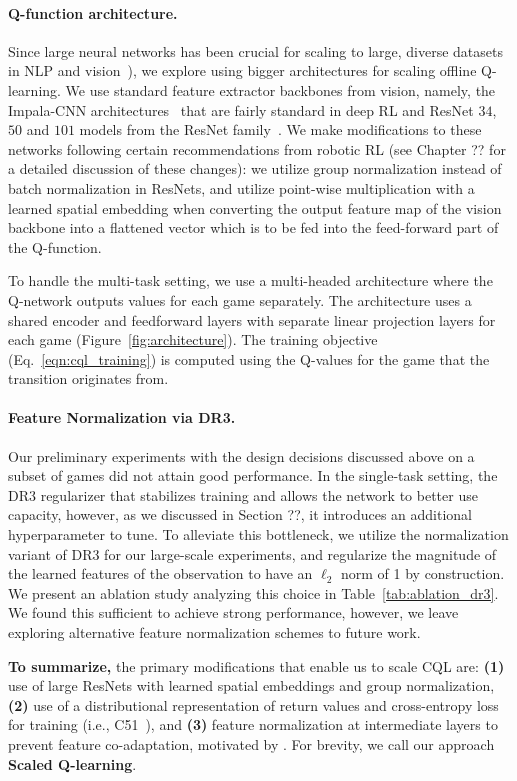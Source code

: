 \paragraph{Q-function architecture.} 
Since large neural networks has been crucial for scaling to large, diverse datasets in NLP and vision~\citep[e.g.,][]{tan2019efficientnet, brown2020language, kaplan2020scaling}), we explore using bigger architectures for scaling offline Q-learning. We use standard feature extractor backbones from vision, namely, the Impala-CNN architectures~\citep{espeholt2018impala} that are fairly standard in deep RL and ResNet $34$, $50$ and $101$ models from the ResNet family~\citep{resnet}. We make modifications to these networks following certain recommendations from robotic RL (see Chapter ?? for a detailed discussion of these changes): we utilize group normalization instead of batch normalization in ResNets, and utilize point-wise multiplication with a learned spatial embedding when converting the output feature map of the vision backbone into a flattened vector which is to be fed into the feed-forward part of the Q-function. 

To handle the multi-task setting, we use a multi-headed architecture where the Q-network outputs values for each game separately. The architecture uses a shared encoder and feedforward layers with separate linear projection layers for each game (Figure~\ref{fig:architecture}). The training objective (Eq.~\ref{eqn:cql_training}) is computed using the Q-values for the game that the transition originates from. 

\paragraph{{Feature Normalization via DR3.}}
Our preliminary experiments with the design decisions discussed above on a subset of games did not attain good performance. In the single-task setting, the DR3 regularizer that stabilizes training and allows the network to better use capacity, however, as we discussed in Section ??, it introduces an additional hyperparameter to tune. To alleviate this bottleneck, we utilize the normalization variant of DR3 for our large-scale experiments, and regularize the magnitude of the learned features of the observation to have an $\ell_2$ norm of 1 by construction. We present an ablation study analyzing this choice in Table~\ref{tab:ablation_dr3}. We found this sufficient to achieve strong performance, however, we leave exploring alternative feature normalization schemes to future work.

\begin{tcolorbox}[colback=blue!6!white,colframe=black,boxsep=0pt,top=3pt,bottom=5pt]
\textbf{To summarize,} the primary modifications that enable us to scale CQL are: \textbf{(1)} use of large ResNets with learned spatial embeddings and group normalization,
\textbf{(2)} use of a distributional representation of return values and cross-entropy loss for training (i.e., C51~\citep{bellemare2017distributional}), and \textbf{(3)} feature normalization at intermediate layers to prevent feature co-adaptation, motivated by \citet{kumar2021dr3}. For brevity, we call our approach \textbf{Scaled Q-learning}.
\end{tcolorbox} 
